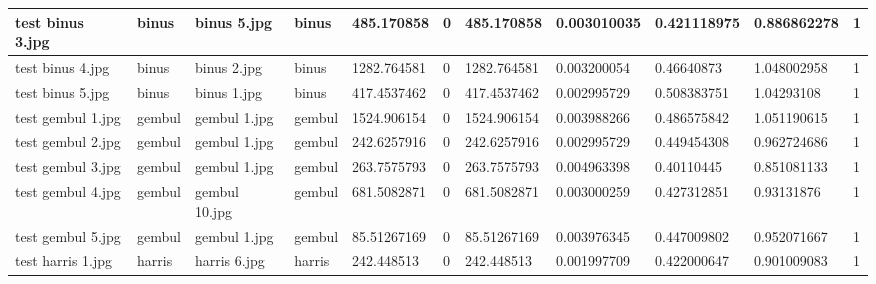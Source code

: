 \begin{landscape}
\begin{longtable}{|p{2cm}|p{1.5cm}|p{2cm}|p{1.5cm}|p{2cm}|p{1cm}|p{2cm}|p{2cm}|p{2cm}|p{2cm}|p{1cm}|}
		test binus 3.jpg     & binus            & binus 5.jpg           & binus                       & 485.170858            & 0                       & 485.170858                 & 0.003010035           & 0.421118975           & 0.886862278              & 1                \\ \hline
		test binus 4.jpg     & binus            & binus 2.jpg           & binus                       & 1282.764581           & 0                       & 1282.764581                & 0.003200054           & 0.46640873            & 1.048002958              & 1                \\ \hline
		test binus 5.jpg     & binus            & binus 1.jpg           & binus                       & 417.4537462           & 0                       & 417.4537462                & 0.002995729           & 0.508383751           & 1.04293108               & 1                \\ \hline
		test gembul 1.jpg    & gembul           & gembul 1.jpg          & gembul                      & 1524.906154           & 0                       & 1524.906154                & 0.003988266           & 0.486575842           & 1.051190615              & 1                \\ \hline
		test gembul 2.jpg    & gembul           & gembul 1.jpg          & gembul                      & 242.6257916           & 0                       & 242.6257916                & 0.002995729           & 0.449454308           & 0.962724686              & 1                \\ \hline
		test gembul 3.jpg    & gembul           & gembul 1.jpg          & gembul                      & 263.7575793           & 0                       & 263.7575793                & 0.004963398           & 0.40110445            & 0.851081133              & 1                \\ \hline
		test gembul 4.jpg    & gembul           & gembul 10.jpg         & gembul                      & 681.5082871           & 0                       & 681.5082871                & 0.003000259           & 0.427312851           & 0.93131876               & 1                \\ \hline
		test gembul 5.jpg    & gembul           & gembul 1.jpg          & gembul                      & 85.51267169           & 0                       & 85.51267169                & 0.003976345           & 0.447009802           & 0.952071667              & 1                \\ \hline
		test harris 1.jpg    & harris           & harris 6.jpg          & harris                      & 242.448513            & 0                       & 242.448513                 & 0.001997709           & 0.422000647           & 0.901009083              & 1                \\ \hline

\end{longtable}
\end{landscape}
